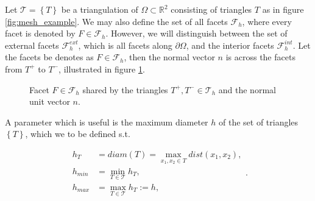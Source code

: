Let $\mathcal{T}  = \left\{ T \right\} $ be a triangulation of $\Omega \subset   \mathbb{R} ^2 $ consisting of triangles $T$ as in figure \ref{fig:mesh_example}. We may also define the set of all facets $\mathcal{F}_{h}$, where every facet is denoted by $F \in \mathcal{F} _{h}$. However, we will distinguish between the
set of external facets $\mathcal{F}^{ext} _{h}$, which is all facets along $\partial \Omega $, and the interior facets $\mathcal{F} ^{int}_{h}$. Let the facets be denotes as $F \in \mathcal{F } _{h}$, then the normal vector $n$ is across the facets from
$T^{+}$ to $T^{-}$, illustrated in figure \ref{fig:normal}.

\begin{figure}[!h]
\centering
{}
\caption{Facet $F \in \mathcal{F}_h $ shared by the triangles $T^{+}, T^{-} \in \mathcal{T}_{h} $ and the normal unit vector $n$.  }
    \label{fig:normal}
\end{figure}

A parameter which is useful is the maximum diameter $h$ of the set of triangles $\left\{ T \right\} $, which we to be defined s.t.

\begin{equation}
\begin{split}
    h _{T} & = diam\left( T \right)   = \max_{x_1, x_{2} \in T} dist(x_{1}, x_{2}),  \\
    h_{min} & = \min_{T \in \mathcal{T} } h_{T}, \\
    h_{max} &= \max_{T \in \mathcal{T} }  h_{T} := h,
\end{split}
.\end{equation}

